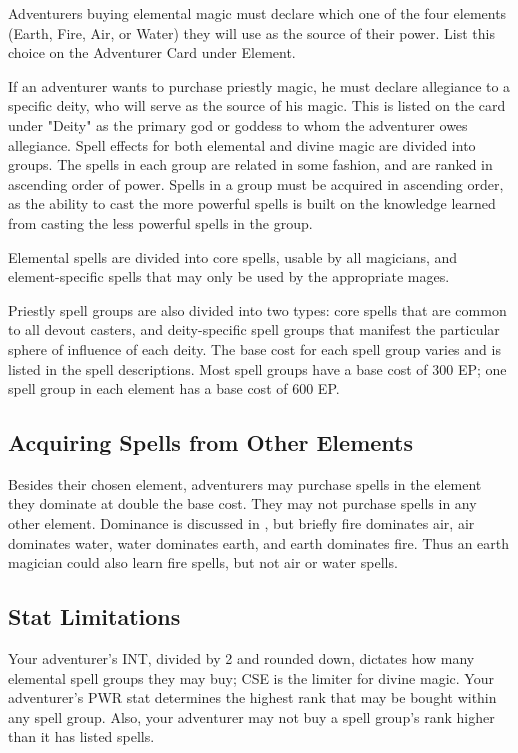 Adventurers buying elemental magic must declare which one of the four elements (Earth, Fire, Air, or Water) they will use as the source of their power. List this choice on the Adventurer Card under Element.

If an adventurer wants to purchase priestly magic, he must declare allegiance to a specific deity, who will serve as the source of his magic. This is listed on the card under "Deity" as the primary god or goddess to whom the adventurer owes allegiance.
Spell effects for both elemental and divine magic are divided into groups. The spells in each group are related in some fashion, and are ranked in ascending order of power.
Spells in a group must be acquired in ascending order, as the ability to cast the more powerful spells is built on the knowledge learned from casting the less powerful spells in the group.

Elemental spells are divided into core spells, usable by all magicians, and element-specific spells that may only be used by the appropriate mages.

Priestly spell groups are also divided into two types: core spells that are common to all devout casters, and deity-specific spell groups that manifest the particular sphere of influence of each deity.
The base cost for each spell group varies and is listed in the spell descriptions. Most spell groups have a base cost of 300 EP; one spell group in each element has a base cost of 600 EP.
\subsection{Acquiring Spells from Other Elements}
\label{acquiring-spells-other-elements}

Besides their chosen element, adventurers may purchase spells in the element they dominate at double the base cost. They may not purchase spells in any other element.
Dominance is discussed in , but briefly fire dominates air, air dominates water, water dominates earth, and earth dominates fire. Thus an earth magician could also learn fire spells, but not air or water spells.
\subsection{Stat Limitations}

Your adventurer's INT, divided by 2 and rounded down, dictates how many elemental spell groups they may buy; CSE is the limiter for divine magic. Your adventurer's PWR stat determines the highest rank that may be bought within any spell group. Also, your adventurer may not buy a spell group's rank higher than it has listed spells.

